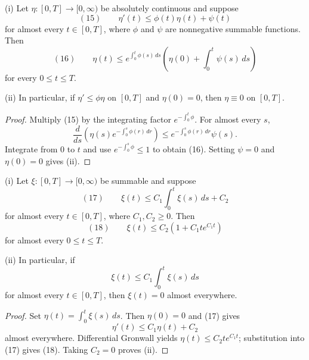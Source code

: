 \begin{lemma}
\label{lem:gronwalls-inequality-differential-form}
(i) Let $\eta:[0,T]\to[0,\infty)$ be absolutely continuous and suppose
\[
(15)\qquad
\eta'(t)\leq\phi(t)\eta(t)+\psi(t)
\]
for almost every $t\in[0,T]$, where $\phi$ and $\psi$ are nonnegative summable functions. Then
\[
(16)\qquad
\eta(t)
\leq e^{\int_0^t\phi(s)\,ds}
\left(\eta(0)+\int_0^t\psi(s)\,ds\right)
\]
for every $0\leq t\leq T$.

(ii) In particular, if $\eta'\leq\phi\eta$ on $[0,T]$ and $\eta(0)=0$, then $\eta\equiv0$ on $[0,T]$.
\end{lemma}
\begin{proof}
\sketch Multiply (15) by the integrating factor $e^{-\int_0^t\phi}$. For almost every $s$,
\[
\frac d{ds}\left(\eta(s)e^{-\int_0^s\phi(r)\,dr}\right)
\leq e^{-\int_0^s\phi(r)\,dr}\psi(s).
\]
Integrate from $0$ to $t$ and use $e^{-\int_0^s\phi}\leq1$ to obtain (16). Setting $\psi=0$ and $\eta(0)=0$ gives (ii).
\end{proof}

\begin{lemma}
\label{lem:gronwalls-inequality-integral-form}

(i) Let $\xi:[0,T]\to[0,\infty)$ be summable and suppose
\[
(17)\qquad
\xi(t)\leq C_1\int_0^t\xi(s)\,ds+C_2
\]
for almost every $t\in[0,T]$, where $C_1,C_2\geq0$. Then
\[
(18)\qquad
\xi(t)\leq C_2(1+C_1te^{C_1t})
\]
for almost every $0\leq t\leq T$.

(ii) In particular, if
\[
\xi(t)\leq C_1\int_0^t\xi(s)\,ds
\]
for almost every $t\in[0,T]$, then $\xi(t)=0$ almost everywhere.
\end{lemma}
\begin{proof}
\sketch Set $\eta(t)=\int_0^t\xi(s)\,ds$. Then $\eta(0)=0$ and (17) gives
\[
\eta'(t)\leq C_1\eta(t)+C_2
\]
almost everywhere. Differential Gronwall yields $\eta(t)\leq C_2te^{C_1t}$; substitution into (17) gives (18). Taking $C_2=0$ proves (ii).
\end{proof}
